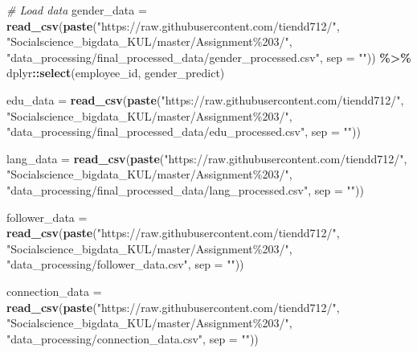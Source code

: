 \documentclass[11pt,]{article}
\newenvironment{Shaded}{\begin{snugshade}}{\end{snugshade}}
\newcommand{\AttributeTok}[1]{\textcolor[rgb]{0.13,0.29,0.53}{#1}}
\newcommand{\CommentTok}[1]{\textcolor[rgb]{0.56,0.35,0.01}{\textit{#1}}}
\newcommand{\FunctionTok}[1]{\textcolor[rgb]{0.13,0.29,0.53}{\textbf{#1}}}
\newcommand{\NormalTok}[1]{#1}
\newcommand{\OtherTok}[1]{\textcolor[rgb]{0.56,0.35,0.01}{#1}}
\newcommand{\SpecialCharTok}[1]{\textcolor[rgb]{0.81,0.36,0.00}{\textbf{#1}}}
\newcommand{\StringTok}[1]{\textcolor[rgb]{0.31,0.60,0.02}{#1}}
\begin{document}
\begin{Shaded}
\begin{Highlighting}[]
\CommentTok{\# Load data}
\NormalTok{gender\_data }\OtherTok{=} \FunctionTok{read\_csv}\NormalTok{(}\FunctionTok{paste}\NormalTok{(}\StringTok{"https://raw.githubusercontent.com/tiendd712/"}\NormalTok{,}
                        \StringTok{"Socialscience\_bigdata\_KUL/master/Assignment\%203/"}\NormalTok{,}
                        \StringTok{"data\_processing/final\_processed\_data/gender\_processed.csv"}\NormalTok{,}
                        \AttributeTok{sep =} \StringTok{""}\NormalTok{)) }\SpecialCharTok{\%\textgreater{}\%}\NormalTok{ dplyr}\SpecialCharTok{::}\FunctionTok{select}\NormalTok{(employee\_id, gender\_predict)}



\NormalTok{edu\_data }\OtherTok{=} \FunctionTok{read\_csv}\NormalTok{(}\FunctionTok{paste}\NormalTok{(}\StringTok{"https://raw.githubusercontent.com/tiendd712/"}\NormalTok{,}
                        \StringTok{"Socialscience\_bigdata\_KUL/master/Assignment\%203/"}\NormalTok{,}
                        \StringTok{"data\_processing/final\_processed\_data/edu\_processed.csv"}\NormalTok{,}
                        \AttributeTok{sep =} \StringTok{""}\NormalTok{)) }

\NormalTok{lang\_data }\OtherTok{=} \FunctionTok{read\_csv}\NormalTok{(}\FunctionTok{paste}\NormalTok{(}\StringTok{"https://raw.githubusercontent.com/tiendd712/"}\NormalTok{,}
                        \StringTok{"Socialscience\_bigdata\_KUL/master/Assignment\%203/"}\NormalTok{,}
                        \StringTok{"data\_processing/final\_processed\_data/lang\_processed.csv"}\NormalTok{,}
                        \AttributeTok{sep =} \StringTok{""}\NormalTok{)) }

\NormalTok{follower\_data }\OtherTok{=} \FunctionTok{read\_csv}\NormalTok{(}\FunctionTok{paste}\NormalTok{(}\StringTok{"https://raw.githubusercontent.com/tiendd712/"}\NormalTok{,}
                        \StringTok{"Socialscience\_bigdata\_KUL/master/Assignment\%203/"}\NormalTok{,}
                        \StringTok{"data\_processing/follower\_data.csv"}\NormalTok{,}
                        \AttributeTok{sep =} \StringTok{""}\NormalTok{)) }

\NormalTok{connection\_data }\OtherTok{=} \FunctionTok{read\_csv}\NormalTok{(}\FunctionTok{paste}\NormalTok{(}\StringTok{"https://raw.githubusercontent.com/tiendd712/"}\NormalTok{,}
                        \StringTok{"Socialscience\_bigdata\_KUL/master/Assignment\%203/"}\NormalTok{,}
                        \StringTok{"data\_processing/connection\_data.csv"}\NormalTok{,}
                        \AttributeTok{sep =} \StringTok{""}\NormalTok{)) }


\end{Highlighting}
\end{Shaded}
\end{document}
